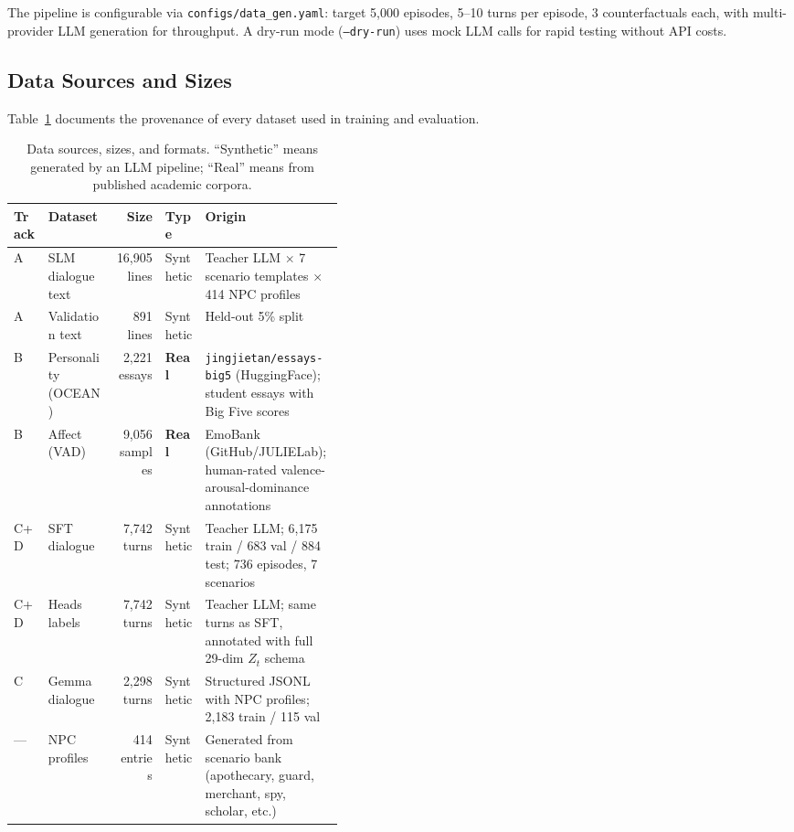 \documentclass[11pt]{article}
\begin{document}
The pipeline is configurable via \texttt{configs/data\_gen.yaml}: target 5,000 episodes, 5--10 turns per episode, 3 counterfactuals each, with multi-provider LLM generation for throughput.
A dry-run mode (\texttt{--dry-run}) uses mock LLM calls for rapid testing without API costs.

\subsection{Data Sources and Sizes}

Table~\ref{tab:datasources} documents the provenance of every dataset used in training and evaluation.

\begin{table}[tp]
\centering
\caption{Data sources, sizes, and formats. ``Synthetic'' means generated by an LLM pipeline; ``Real'' means from published academic corpora.}
\label{tab:datasources}
\footnotesize\setlength{\tabcolsep}{3pt}
\begin{tabular}{@{}llrlp{0.42\linewidth}@{}}
\toprule
\textbf{Track} & \textbf{Dataset} & \textbf{Size} & \textbf{Type} & \textbf{Origin} \\
\midrule
A & SLM dialogue text & 16,905 lines & Synthetic & Teacher LLM $\times$ 7 scenario templates $\times$ 414 NPC profiles \\
A & Validation text & 891 lines & Synthetic & Held-out 5\% split \\
\midrule
B & Personality (OCEAN) & 2,221 essays & \textbf{Real} & \texttt{jingjietan/essays-big5} (HuggingFace); student essays with Big Five scores \\
B & Affect (VAD) & 9,056 samples & \textbf{Real} & EmoBank (GitHub/JULIELab); human-rated valence-arousal-dominance annotations \\
\midrule
C+D & SFT dialogue & 7,742 turns & Synthetic & Teacher LLM; 6,175 train / 683 val / 884 test; 736 episodes, 7 scenarios \\
C+D & Heads labels & 7,742 turns & Synthetic & Teacher LLM; same turns as SFT, annotated with full 29-dim $Z_t$ schema \\
C & Gemma dialogue & 2,298 turns & Synthetic & Structured JSONL with NPC profiles; 2,183 train / 115 val \\
\midrule
--- & NPC profiles & 414 entries & Synthetic & Generated from scenario bank (apothecary, guard, merchant, spy, scholar, etc.) \\
\bottomrule
\end{tabular}
\end{table}
\end{document}
